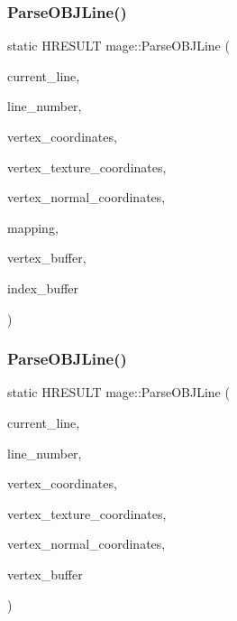 \subsubsection{\texorpdfstring{Parse\+O\+B\+J\+Line()}{ParseOBJLine()}\hspace{0.1cm}{\footnotesize\ttfamily [1/2]}}
{\footnotesize\ttfamily static H\+R\+E\+S\+U\+LT mage\+::\+Parse\+O\+B\+J\+Line (\begin{DoxyParamCaption}\item[{char $\ast$}]{current\+\_\+line,  }\item[{uint32\+\_\+t}]{line\+\_\+number,  }\item[{vector$<$ \hyperlink{structmage_1_1_point3}{Point3} $>$ \&}]{vertex\+\_\+coordinates,  }\item[{vector$<$ X\+M\+F\+L\+O\+A\+T2 $>$ \&}]{vertex\+\_\+texture\+\_\+coordinates,  }\item[{vector$<$ \hyperlink{structmage_1_1_normal3}{Normal3} $>$ \&}]{vertex\+\_\+normal\+\_\+coordinates,  }\item[{map$<$ X\+M\+U\+I\+N\+T3, uint32\+\_\+t, \hyperlink{structmage_1_1_o_b_j_comparator_x_m_u_i_n_t3}{O\+B\+J\+Comparator\+X\+M\+U\+I\+N\+T3} $>$ \&}]{mapping,  }\item[{vector$<$ \hyperlink{structmage_1_1_vertex}{Vertex} $>$ \&}]{vertex\+\_\+buffer,  }\item[{vector$<$ uint32\+\_\+t $>$ \&}]{index\+\_\+buffer }\end{DoxyParamCaption})\hspace{0.3cm}{\ttfamily [static]}}

\hypertarget{namespacemage_a68ffe3226f626e65c4b58e02d50a9c71}{}\label{namespacemage_a68ffe3226f626e65c4b58e02d50a9c71} 
\subsubsection{\texorpdfstring{Parse\+O\+B\+J\+Line()}{ParseOBJLine()}\hspace{0.1cm}{\footnotesize\ttfamily [2/2]}}
{\footnotesize\ttfamily static H\+R\+E\+S\+U\+LT mage\+::\+Parse\+O\+B\+J\+Line (\begin{DoxyParamCaption}\item[{char $\ast$}]{current\+\_\+line,  }\item[{uint32\+\_\+t}]{line\+\_\+number,  }\item[{vector$<$ \hyperlink{structmage_1_1_point3}{Point3} $>$ \&}]{vertex\+\_\+coordinates,  }\item[{vector$<$ X\+M\+F\+L\+O\+A\+T2 $>$ \&}]{vertex\+\_\+texture\+\_\+coordinates,  }\item[{vector$<$ \hyperlink{structmage_1_1_normal3}{Normal3} $>$ \&}]{vertex\+\_\+normal\+\_\+coordinates,  }\item[{vector$<$ \hyperlink{structmage_1_1_vertex}{Vertex} $>$ \&}]{vertex\+\_\+buffer }\end{DoxyParamCaption})\hspace{0.3cm}{\ttfamily [static]}}

